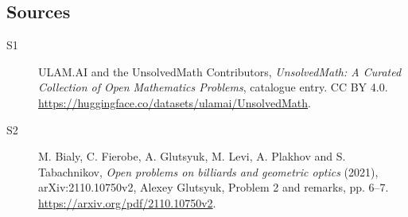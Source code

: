 \documentclass[11pt]{article}
\begin{document}
\subsection{Sources}
\begin{description}
\item[\hypertarget{source:statement:1}{S1}] ULAM.AI and the UnsolvedMath Contributors, \emph{UnsolvedMath: A Curated Collection of Open Mathematics Problems}, catalogue entry. CC BY 4.0. \url{https://huggingface.co/datasets/ulamai/UnsolvedMath}.
\item[\hypertarget{source:statement:2}{S2}] M. Bialy, C. Fierobe, A. Glutsyuk, M. Levi, A. Plakhov and S. Tabachnikov, \emph{Open problems on billiards and geometric optics} (2021), arXiv:2110.10750v2, Alexey Glutsyuk, Problem 2 and remarks, pp. 6--7. \url{https://arxiv.org/pdf/2110.10750v2}.
\end{description}
\label{end:statement}
\end{document}
